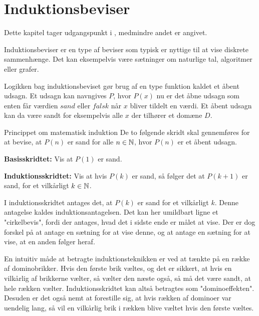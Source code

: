 \chapter{Induktionsbeviser}

Dette kapitel tager udgangspunkt i \citep{dmat}, medmindre andet er angivet.

Induktionsbeviser er en type af beviser som typisk er nyttige til at vise diskrete sammenhænge.
Det kan eksempelvis være sætninger om naturlige tal, algoritmer eller grafer.

Logikken bag induktionsbeviset gør brug af en type funktion kaldet et åbent udsagn.
Et udsagn kan navngives $P$, hvor $P(x)$ nu er det åbne udsagn som enten får værdien $sand$ eller $falsk$ når $x$ bliver tildelt en værdi.
Et åbent udsagn kan da være sandt for eksempelvis alle $x$ der tilhører et domæne $D$.

\begin{theorembox}{Princippet om matematisk induktion}
	De to følgende skridt skal gennemføres for at bevise, at $P(n)$ er sand for alle $n \in \mathbb{N}$, hvor $P(n)$ er et åbent udsagn.

	\textbf{Basisskridtet:} \quad 
	Vis at $P(1)$ er sand.
	
	\textbf{Induktionsskridtet:} \quad 
	Vis at hvis $P(k)$ er sand, så følger det at $P(k + 1)$ er sand, for et vilkårligt $k \in \mathbb{N}$.
\end{theorembox}

I induktionsskridtet antages det, at $P(k)$ er sand for et vilkårligt $k$.
Denne antagelse kaldes induktionsantagelsen.
Det kan her umildbart ligne et "cirkelbevis", fordi der antages, hvad det i sidste ende er målet at vise.
Der er dog forskel på at antage en sætning for at vise denne, og at antage en sætning for at vise, at en anden følger heraf.

En intuitiv måde at betragte induktionsteknikken er ved at tænkte på en række af dominobrikker.
Hvis den første brik væltes, og det er sikkert, at hvis en vilkårlig af brikkerne vælter, så vælter den næste også, så må det være sandt, at hele rækken vælter.
Induktionsskridtet kan altså betragtes som "dominoeffekten".
Desuden er det også nemt at forestille sig, at hvis rækken af dominoer var uendelig lang, så vil en vilkårlig brik i rækken blive væltet hvis den første væltes. 

